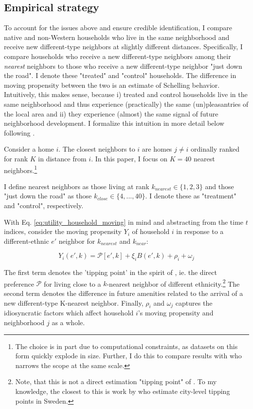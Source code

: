 \documentclass[../main.tex]{subfiles}
\begin{document}
\subsection{Empirical strategy}
To account for the issues above and ensure credible identification, I compare native and non-Western households who live in the same neighborhood and receive new different-type neighbors at slightly different distances.  Specifically, I compare households who receive a new different-type neighbors among their \textit{nearest} neighbors to those who receive a new different-type neighbor "just down the road". I denote these "treated" and "control" households. The difference in moving propensity between the two is an estimate of Schelling behavior. Intuitively, this makes sense, because i) treated and control households live in the same neighborhood and thus experience (practically) the same (un)pleasantries of the local area and ii) they experience (almost) the same signal of future neighborhood development. I formalize this intuition in more detail below following \textcite{Bayer_2022_nearest_neighbor}.

Consider a home $i$. The closest neighbors to $i$ are homes $j\neq i$ ordinally ranked for rank $K$ in distance from $i$. 
In this paper, I focus on $K=40$ nearest neighbors.\footnote{The choice is in part due to computational constraints, as datasets on this form quickly explode in size. Further, I do this to compare results with \textcite{Bayer_2022_nearest_neighbor} who narrows the scope at the same scale.}

I define nearest neighbors as those living at rank $k_{nearest}\in \{1, 2, 3\}$ and those "just down the road" as those $k_{close} \in \{4, ..., 40\}$. I denote these as "treatment" and "control", respectively.

With Eq. \ref{eq:utility_household_moving} in mind and abstracting from the time $t$ indices, consider the moving propensity $Y_i$ of household $i$ in response to a different-ethnic $e'$ neighbor for $k_{nearest}$ and $k_{near}$:

\begin{equation}
    Y_i(e', k) = \mathcal{P}[e', k] + \xi_i B(e', k) + \rho_i + \omega_j
\end{equation}

The first term denotes the 'tipping point' in the spirit of \textcite{schelling1971dynamic}, ie. the direct preference $\mathcal{P}$ for living close to a $k$-nearest neighbor of different ethnicity.\footnote{Note, that this is not a direct estimation "tipping point" of \textcite{schelling1971dynamic}. To my knowledge, the closest to this is work by \textcite{bohlmark_willen_2020_tipping} who estimate city-level tipping points in Sweden.}   The second term denotes the difference in future amenities related  to the arrival of a new different-type K-nearest neighbor. Finally, $\rho_i$ and $\omega_j$ captures the idiosyncratic factors which affect household $i$'s moving propensity and neighborhood $j$ as a whole. 
\end{document}
